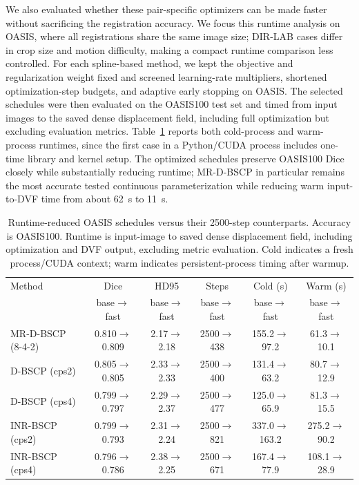 
We also evaluated whether these pair-specific optimizers can be made faster
without sacrificing the registration accuracy. We focus this runtime analysis on
OASIS, where all registrations share the same image size; DIR-LAB cases differ
in crop size and motion difficulty, making a compact runtime comparison less
controlled. For each spline-based method, we kept the objective and
regularization weight fixed and screened learning-rate multipliers, shortened
optimization-step budgets, and adaptive early stopping on OASIS. The selected
schedules were then evaluated on the OASIS100 test set and timed from input
images to the saved dense displacement field, including full optimization but
excluding evaluation metrics. Table~\ref{tab:oasis_runtime} reports both
cold-process and warm-process runtimes, since the first case in a Python/CUDA
process includes one-time library and kernel setup. The optimized schedules
preserve OASIS100 Dice closely while substantially reducing runtime; MR-D-BSCP
in particular remains the most accurate tested continuous parameterization
while reducing warm input-to-DVF time from about 62~s to 11~s.

\begin{table}[t]
\centering
\caption{Runtime-reduced OASIS schedules versus their 2500-step counterparts.
Accuracy is OASIS100. Runtime is input-image to saved dense displacement field,
including optimization and DVF output, excluding metric evaluation. Cold
indicates a fresh process/CUDA context; warm indicates persistent-process timing
after warmup.}
\label{tab:oasis_runtime}
\fontsize{8}{9}\selectfont
\setlength{\tabcolsep}{2.5pt}
\begin{tabular}{@{}lccccc@{}}
\hline
Method & Dice & HD95 & Steps & Cold (s) & Warm (s) \\
 & base$\rightarrow$fast & base$\rightarrow$fast & base$\rightarrow$fast & base$\rightarrow$fast & base$\rightarrow$fast \\
\hline
MR-D-BSCP (8-4-2) &
0.810$\rightarrow$0.809 & 2.17$\rightarrow$2.18 &
2500$\rightarrow$438 & 155.2$\rightarrow$97.2 & 61.3$\rightarrow$10.1 \\
D-BSCP (cps2) &
0.805$\rightarrow$0.805 & 2.33$\rightarrow$2.33 &
2500$\rightarrow$400 & 131.4$\rightarrow$63.2 & 80.7$\rightarrow$12.9 \\
D-BSCP (cps4) &
0.799$\rightarrow$0.797 & 2.29$\rightarrow$2.37 &
2500$\rightarrow$477 & 125.0$\rightarrow$65.9 & 81.3$\rightarrow$15.5 \\
INR-BSCP (cps2) &
0.799$\rightarrow$0.793 & 2.31$\rightarrow$2.24 &
2500$\rightarrow$821 & 337.0$\rightarrow$163.2 & 275.2$\rightarrow$90.2 \\
INR-BSCP (cps4) &
0.796$\rightarrow$0.786 & 2.38$\rightarrow$2.25 &
2500$\rightarrow$671 & 167.4$\rightarrow$77.9 & 108.1$\rightarrow$28.9 \\
\hline
\end{tabular}
\end{table}

